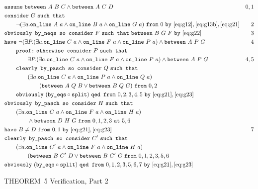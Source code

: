 \begin{boxedfigure}
\scriptsize
  \begin{align*}
    &\code{assume}\ \between{A}{B}{C} \wedge \between{A}{C}{D} & 0,1\\
    &\code{consider}\ G\ \code{such that}\\
    &\qquad\Triangle{a}{A}{B}{G}\ \code{from}\ 0\ \code{by}\ \eqref{eq:g12},\eqref{eq:g13b},\eqref{eq:g21}&2\\
    &\code{obviously by\_neqs so consider}\ F\ \code{such that}\ \between{B}{G}{F}\ \code{by}\ \eqref{eq:g22}&3\\
    &\code{have}\ \neg(\exists P. (\exists a. \code{on\_line}\ C\ a\wedge\code{on\_line}\ F\ a\wedge\code{on\_line}\ P\ a)\wedge\between{A}{P}{G} & 4\\
    &\qquad\code{proof:}\ \code{otherwise consider}\ P\ \code{such that}\\
    &\qquad\qquad \exists P. (\exists a. \code{on\_line}\ C\ a\wedge\code{on\_line}\ F\ a\wedge\code{on\_line}\ P\ a) \wedge\between{A}{P}{G}& 4,5\\
    &\qquad\code{clearly by\_pasch so consider}\ Q\ \code{such that}\\
    &\qquad\qquad(\exists a. \code{on\_line}\ C\ a\wedge\code{on\_line}\ P\ a\wedge\code{on\_line}\ Q\ a)\\
    &\qquad\qquad\qquad(\between{A}{Q}{B} \vee \between{B}{Q}{G})\ \code{from}\ 0,2\\
    &\qquad\code{obviously}\ (\code{by\_eqs}\circ\code{split})\ \code{qed from}\ 0,2,3,4,5\ \code{by}\ \eqref{eq:g21},\eqref{eq:g23}\\
    &\code{obviously by\_pasch so consider}\ H\ \code{such that}\\
    &\qquad(\exists a. \code{on\_line}\ C\ a\wedge\code{on\_line}\ F\ a\wedge\code{on\_line}\ H\ a)\\
    &\qquad\qquad\wedge\between{D}{H}{G}\ \code{from}\ 0,1,2,3\ \code{at}\ 5,6\\
    &\code{have}\ B\neq D\ \code{from}\ 0,1\ \code{by}\ \eqref{eq:g21},\eqref{eq:g23} & 7\\
    &\code{clearly by\_pasch so consider}\ C'\ \code{such that}\\
    &\qquad (\exists a. \code{on\_line}\ C'\ a\wedge\code{on\_line}\ F\ a\wedge\code{on\_line}\ H\ a)\\
    &\qquad\qquad(\between{B}{C'}{D} \vee \between{B}{C'}{G}\ \code{from}\ 0,1,2,3,5,6\\
    &\code{obviously}\ (\code{by\_eqs}\circ\code{split})\ \code{qed from}\ 0,1,2,3,5,6,7\ \code{by}\ \eqref{eq:g21},\eqref{eq:g23}
  \end{align*}
  \caption{THEOREM~5 Verification, Part 2}
  \label{fig:FiveVerification2}
\end{boxedfigure}

